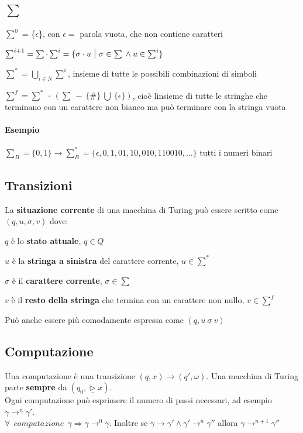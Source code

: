 \documentclass[10pt]{book}
\begin{document}
\subsection{$\sum$}
\begin{list}{}{}
	\item $\sum^0$ = \{$\epsilon$\}, con $\epsilon =$ parola vuota, che non contiene caratteri
	\item $\sum^{i+1} = \sum \cdot \sum^i = \{\sigma \cdot u \:\:\vline\:\: \sigma \in \sum \:\wedge\: u \in \sum^i\}$
	\item $\sum^* = \bigcup_{i \in N}\sum^i$, insieme di tutte le possibili combinazioni di simboli
	\item $\sum^f = \sum^* \:\cdot\: (\sum \:-\: \{\#\} \:\bigcup\: \{\epsilon\})$, cioè linsieme di tutte le stringhe che terminano con un carattere non bianco ma può terminare con la stringa vuota
\end{list}
\paragraph{Esempio} $\sum_B = \{0, 1\} \longrightarrow \sum_B^* = \{\epsilon, 0, 1, 01, 10, 010, 110010, \ldots\}$ tutti i numeri binari

\subsection{Transizioni}
La \textbf{situazione corrente} di una macchina di Turing può essere scritto come $(q, u, \sigma, v)$ dove:
\begin{list}{}{}
	\item $q$ è lo \textbf{stato attuale}, $q \in Q$
	\item $u$ è la \textbf{stringa a sinistra} del carattere corrente, $u \in \sum^*$
	\item $\sigma$ è il \textbf{carattere corrente}, $\sigma \in \sum$
	\item $v$ è il \textbf{resto della stringa} che termina con un carattere non nullo, $v \in \sum^f$
\end{list}
Può anche essere più comodamente espressa come $(q, u \:\underline{\sigma}\: v)$

\subsection{Computazione}
Una computazione è una transizione $(q, x) \longrightarrow (q', \omega)$. Una macchina di Turing parte \textbf{sempre} da $(q_0, \underline{\triangleright} x)$.\\
Ogni computazione può esprimere il numero di passi necessari, ad esempio $\gamma \longrightarrow^n \gamma'$.\\
$\forall \:\:computazione\:\: \gamma \Rightarrow \gamma \longrightarrow^0 \gamma$. Inoltre se $\gamma \longrightarrow \gamma' \wedge \gamma' \longrightarrow^n \gamma''$ allora $\gamma \longrightarrow^{n+1} \gamma''$
\end{document}
